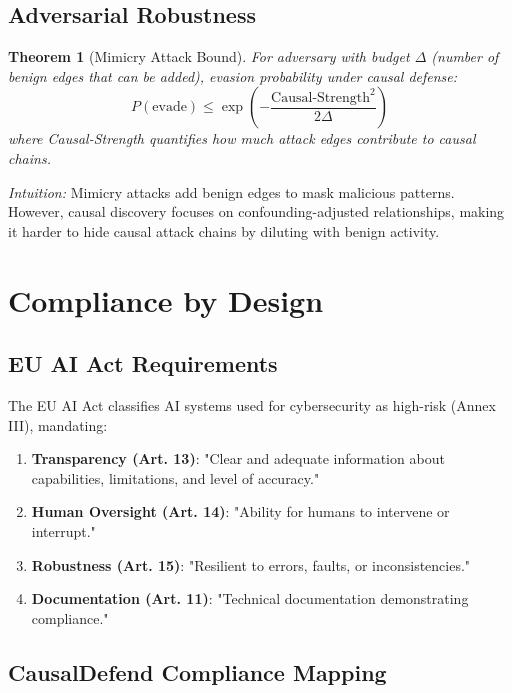\documentclass[conference]{IEEEtran}
\newtheorem{theorem}{Theorem}
\begin{document}
\subsection{Adversarial Robustness}

\begin{theorem}[Mimicry Attack Bound]
For adversary with budget $\Delta$ (number of benign edges that can be added), evasion probability under causal defense:
\begin{equation}
P(\text{evade}) \leq \exp\left(-\frac{\text{Causal-Strength}^2}{2\Delta}\right)
\end{equation}
where Causal-Strength quantifies how much attack edges contribute to causal chains.
\end{theorem}

\textit{Intuition:} Mimicry attacks add benign edges to mask malicious patterns. However, causal discovery focuses on confounding-adjusted relationships, making it harder to hide causal attack chains by diluting with benign activity.

\section{Compliance by Design}\label{sec:compliance}

\subsection{EU AI Act Requirements}

The EU AI Act \cite{eu_ai_act} classifies AI systems used for cybersecurity as high-risk (Annex III), mandating:

\begin{enumerate}
    \item \textbf{Transparency (Art. 13)}: "Clear and adequate information about capabilities, limitations, and level of accuracy."
    
    \item \textbf{Human Oversight (Art. 14)}: "Ability for humans to intervene or interrupt."
    
    \item \textbf{Robustness (Art. 15)}: "Resilient to errors, faults, or inconsistencies."
    
    \item \textbf{Documentation (Art. 11)}: "Technical documentation demonstrating compliance."
\end{enumerate}

\subsection{CausalDefend Compliance Mapping}
\end{document}
